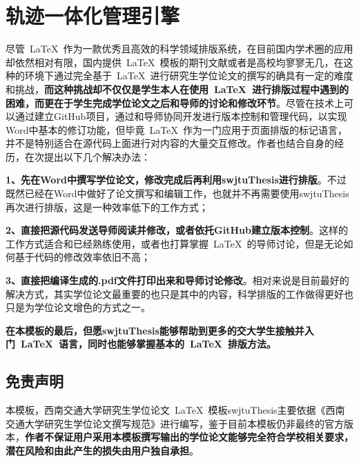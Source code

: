 \chapter{轨迹一体化管理引擎}

尽管~\LaTeX{}~作为一款优秀且高效的科学领域排版系统，在目前国内学术圈的应用却依然相对有限，国内提供~\LaTeX{}~模板的期刊文献或者是高校均寥寥无几，在这种的环境下通过完全基于~\LaTeX{}~进行研究生学位论文的撰写的确具有一定的难度和挑战，\textbf{而这种挑战却不仅仅是学生本人在使用~\LaTeX{}~进行排版过程中遇到的困难，而更在于学生完成学位论文之后和导师的讨论和修改环节}。尽管在技术上可以通过建立GitHub项目，通过和导师协同开发进行版本控制和管理代码，以实现Word中基本的修订功能，但毕竟~\LaTeX{}~作为一门应用于页面排版的标记语言，并不是特别适合在源代码上面进行对内容的大量交互修改。作者也结合自身的经历，在次提出以下几个解决办法：

\par
\textbf{1、先在Word中撰写学位论文，修改完成后再利用swjtuThesis进行排版}。不过既然已经在Word中做好了论文撰写和编辑工作，也就并不再需要使用swjtuThesis再次进行排版，这是一种效率低下的工作方式；

\par
\textbf{2、直接把源代码发送导师阅读并修改，或者依托GitHub建立版本控制}。这样的工作方式适合和已经熟练使用，或者也打算掌握~\LaTeX{}~的导师讨论，但是无论如何基于代码的修改效率依旧不高；

\par
\textbf{3、直接把编译生成的.pdf文件打印出来和导师讨论修改}。相对来说是目前最好的解决方式，其实学位论文最重要的也只是其中的内容，科学排版的工作做得更好也只是为学位论文增色的方式之一。

\par
\textbf{在本模板的最后，但愿swjtuThesis能够帮助到更多的交大学生接触并入门~\LaTeX{}~语言，同时也能够掌握基本的~\LaTeX{}~排版方法。}

\section{免责声明}
本模板，西南交通大学研究生学位论文~\LaTeX{}~模板swjtuThesis主要依据《西南交通大学研究生学位论文撰写规范》进行编写，鉴于目前本模板仍非最终的官方版本，\textbf{作者不保证用户采用本模板撰写输出的学位论文能够完全符合学校相关要求，潜在风险和由此产生的损失由用户独自承担}。

